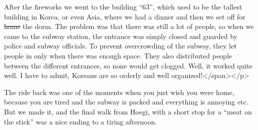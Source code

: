 \begin{post}
\begin{content}
After the fireworks we went to the building ``63'', which used to be the tallest building in Korea, or even Asia, where we had a dinner and then we set off for \sout{home} the dorm. The problem was that there was still a lot of people, so when we came to the subway station, the entrance was simply closed and guarded by police and subway officials. To prevent overcrowding of the subway, they let people in only when there was enough space. They also distributed people between the different entrances, so none would get clogged. Well, it worked quite well. I have to admit, Koreans are so orderly and well organized!</span></p>

\begin{figure}[h]
\centering
{}
\end{figure}

The ride back was one of the moments when you just wish you were home, because you are tired and the subway is packed and everything is annoying etc. But we made it, and the final walk from Hoegi, with a short stop for a ``meat on the stick'' was a nice ending to a tiring afternoon.
\end{content}
\end{post}
